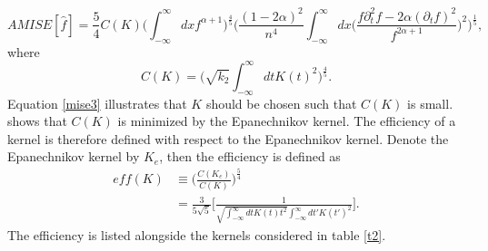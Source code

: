 \begin{equation}
	AMISE[\hat{f}]= \frac{5}{4}C(K)\bigg(\int_{-\infty}^{\infty}dxf^{\alpha+1}\bigg)^\frac{4}{5}\bigg(\frac{(1-2\alpha)^2}{n^4}\int_{-\infty}^{\infty}dx\bigg(\frac{f\partial_t^2f-2\alpha(\partial_tf)^2}{f^{2\alpha+1}}\bigg)^2\bigg)^\frac{1}{5},
	\label{mise3}
\end{equation}
where
\begin{equation}
	C(K)=\bigg(\sqrt{k_2}\int_{-\infty}^{\infty}dt K(t)^2\bigg)^{\frac{4}{5}}.
	\label{ck}
\end{equation}
Equation \eqref{mise3} illustrates that $K$ should be chosen such that $C(K)$ is small. \citep{silverman} shows that $C(K)$ is minimized by the Epanechnikov kernel. The efficiency of a kernel is therefore defined with respect to the Epanechnikov kernel. Denote the Epanechnikov kernel by $K_e$, then the efficiency is defined as
\begin{equation}
	\begin{split}
		eff(K)&\equiv \bigg(\frac{C(K_e)}{C(K)}\bigg)^{\frac{5}{4}}\\
		&=\frac{3}{5\sqrt{5}}\bigg[\frac{1}{\sqrt{\int_{-\infty}^{\infty}dt K(t)t^2}\int_{-\infty}^{\infty}dt' K(t')^2}\bigg].
	\end{split}
\end{equation}
The efficiency is listed alongside the kernels considered in table \ref{t2}.


